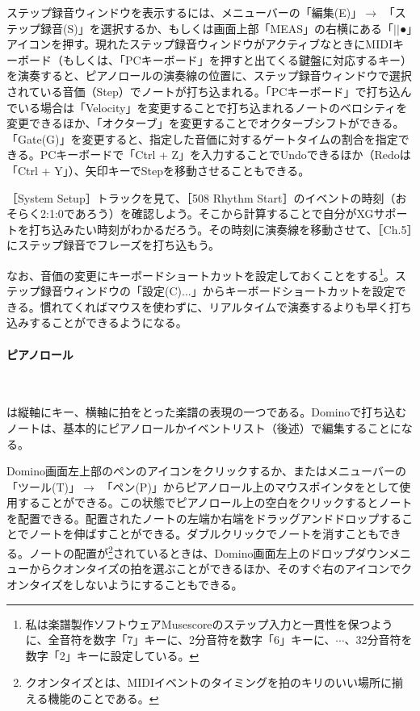 \documentclass[uplatex, 10pt, dvipdfmx]{jsarticle}
\numberwithin{equation}{section}
\newcommand{\emphj}[1]{\textbf{\textrm{\textgt{{#1}}}}}
\begin{document}
ステップ録音ウィンドウを表示するには、メニューバーの「編集(E)」$\rightarrow$ 「ステップ録音(S)」を選択するか、もしくは画面上部「MEAS」の右横にある「$\vert\vert$●」アイコンを押す。現れたステップ録音ウィンドウがアクティブなときにMIDIキーボード（もしくは、「PCキーボード」を押すと出てくる鍵盤に対応するキー）を演奏すると、ピアノロールの演奏線の位置に、ステップ録音ウィンドウで選択されている音価（Step）でノートが打ち込まれる。「PCキーボード」で打ち込んでいる場合は「Velocity」を変更することで打ち込まれるノートのベロシティを変更できるほか、「オクターブ」を変更することでオクターブシフトができる。「Gate(G)」を変更すると、指定した音価に対するゲートタイムの割合を指定できる。PCキーボードで「Ctrl + Z」を入力することでUndoできるほか（Redoは「Ctrl + Y」）、矢印キーでStepを移動させることもできる。

［System Setup］トラックを見て、［508 Rhythm Start］のイベントの時刻（おそらく2:1:0であろう）を確認しよう。そこから計算することで自分がXGサポートを打ち込みたい時刻がわかるだろう。その時刻に演奏線を移動させて、［Ch.5］にステップ録音でフレーズを打ち込もう。

なお、音価の変更にキーボードショートカットを設定しておくことを\emphj{強く推奨}する\footnote{私は楽譜製作ソフトウェアMusescoreのステップ入力と一貫性を保つように、全音符を数字「7」キーに、2分音符を数字「6」キーに、$\cdots$、32分音符を数字「2」キーに設定している。}。ステップ録音ウィンドウの「設定(C)...」からキーボードショートカットを設定できる。慣れてくればマウスを使わずに、リアルタイムで演奏するよりも早く打ち込みすることができるようになる。

\paragraph{ピアノロール} \

\emphj{ピアノロール}は縦軸にキー、横軸に拍をとった楽譜の表現の一つである。Dominoで打ち込むノートは、基本的にピアノロールかイベントリスト（後述）で編集することになる。

Domino画面左上部のペンのアイコンをクリックするか、またはメニューバーの「ツール(T)」$\rightarrow$ 「ペン(P)」からピアノロール上のマウスポインタを\emphj{ペンツール}として使用することができる。この状態でピアノロール上の空白をクリックするとノートを配置できる。配置されたノートの左端か右端をドラッグアンドドロップすることでノートを伸ばすことができる。ダブルクリックでノートを消すこともできる。ノートの配置が\emphj{クオンタイズ}\footnote{クオンタイズとは、MIDIイベントのタイミングを拍のキリのいい場所に揃える機能のことである。}されているときは、Domino画面左上のドロップダウンメニューからクオンタイズの拍を選ぶことができるほか、そのすぐ右のアイコンでクオンタイズをしないようにすることもできる。
\end{document}
